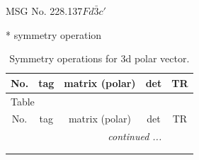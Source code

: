 \documentclass[fleqn,8pt]{jsarticle}
\begin{document}
\setcounter{MaxMatrixCols}{32}

\renewcommand{\tablename}{Table~}
\renewcommand{\figurename}{Figure~}
\begin{center}
\LARGE
MSG No. 228.137\quad$Fd\bar{3}c'$
\end{center}
* symmetry operation
\renewcommand{\arraystretch}{1.3}
\begin{longtable}{ccccc}
\caption{Symmetry operations for 3d polar vector.}
 \\
 \hline \hline
No. & tag & matrix (polar) & det & TR \\ \hline \endfirsthead

\multicolumn{4}{l}{\tablename\ \thetable{}} \\
 \hline \hline
No. & tag & matrix (polar) & det & TR \\ \hline \endhead

 \hline \hline
\multicolumn{4}{r}{\footnotesize\it continued ...} \\ \endfoot

 \hline \hline
\multicolumn{4}{r}{} \\ \endlastfoot


\end{longtable}
\end{document}
